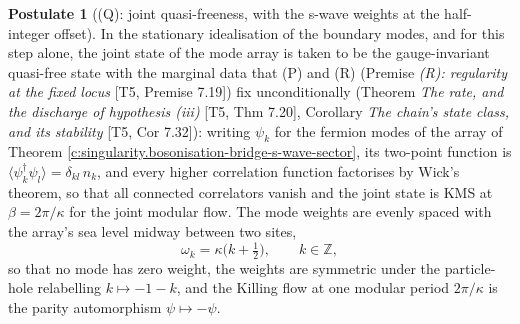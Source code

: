 \documentclass[11pt]{article}
\theoremstyle{definition}
\newtheorem{postulate}[theorem]{Postulate}
\theoremstyle{plain}
\providecommand{\Z}{}\renewcommand{\Z}{\mathbb{Z}}
\begin{document}
\begin{postulate}[(Q): joint quasi-freeness, with the s-wave weights at the half-integer offset]\label{c:singularity.q-joint-quasi-freeness-s-wave}
In the stationary idealisation of the boundary modes, and for this step alone, the joint state of the mode array is taken to be the gauge-invariant quasi-free state with the marginal data that (P) and (R) (Premise \emph{(R): regularity at the fixed locus} [T5, Premise 7.19]) fix unconditionally (Theorem \emph{The rate, and the discharge of hypothesis (iii)} [T5, Thm 7.20], Corollary \emph{The chain's state class, and its stability} [T5, Cor 7.32]): writing $\psi_k$ for the fermion modes of the array of Theorem \ref{c:singularity.bosonisation-bridge-s-wave-sector}, its two-point function is $\langle \psi^\dagger_k \psi_l \rangle = \delta_{kl}\,n_k$, and every higher correlation function factorises by Wick's theorem, so that all connected correlators vanish and the joint state is KMS at $\beta = 2\pi/\kappa$ for the joint modular flow. The mode weights are evenly spaced with the array's sea level midway between two sites,
\[
\omega_k = \kappa\bigl(k + \tfrac12\bigr), \qquad k \in \Z ,
\]
so that no mode has zero weight, the weights are symmetric under the particle-hole relabelling $k \mapsto -1-k$, and the Killing flow at one modular period $2\pi/\kappa$ is the parity automorphism $\psi \mapsto -\psi$.


\end{postulate}
\end{document}
